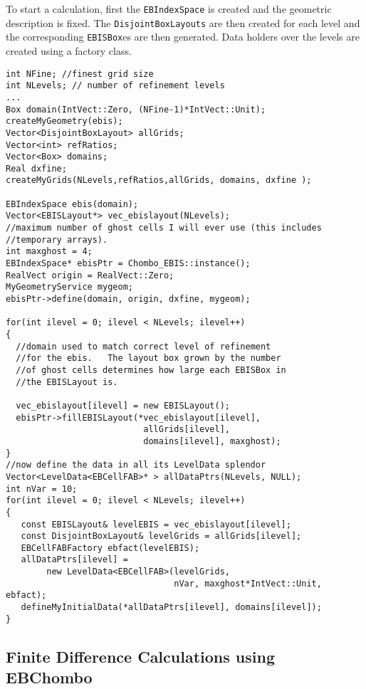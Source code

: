 To start a calculation,
first the {\tt EBIndexSpace} is created and the geometric
description is fixed.    The {\tt DisjointBoxLayouts} are then created
for each level and the corresponding {\tt EBISBox}es are then
generated.  Data holders over the levels are created using
a factory class.
\begin{small}
\begin{verbatim}
int NFine; //finest grid size
int NLevels; // number of refinement levels
...
Box domain(IntVect::Zero, (NFine-1)*IntVect::Unit);
createMyGeometry(ebis);
Vector<DisjointBoxLayout> allGrids;
Vector<int> refRatios;        
Vector<Box> domains;
Real dxfine;        
createMyGrids(NLevels,refRatios,allGrids, domains, dxfine );

EBIndexSpace ebis(domain);
Vector<EBISLayout*> vec_ebislayout(NLevels);
//maximum number of ghost cells I will ever use (this includes
//temporary arrays).
int maxghost = 4;     
EBIndexSpace* ebisPtr = Chombo_EBIS::instance();
RealVect origin = RealVect::Zero;
MyGeometryService mygeom;
ebisPtr->define(domain, origin, dxfine, mygeom);   

for(int ilevel = 0; ilevel < NLevels; ilevel++)
{       
  //domain used to match correct level of refinement
  //for the ebis.   The layout box grown by the number
  //of ghost cells determines how large each EBISBox in
  //the EBISLayout is.      
        
  vec_ebislayout[ilevel] = new EBISLayout();
  ebisPtr->fillEBISLayout(*vec_ebislayout[ilevel],
                           allGrids[ilevel], 
                           domains[ilevel], maxghost);
}
//now define the data in all its LevelData splendor
Vector<LevelData<EBCellFAB>* > allDataPtrs(NLevels, NULL);
int nVar = 10;
for(int ilevel = 0; ilevel < NLevels; ilevel++)
{       
   const EBISLayout& levelEBIS = vec_ebislayout[ilevel];
   const DisjointBoxLayout& levelGrids = allGrids[ilevel];
   EBCellFABFactory ebfact(levelEBIS);
   allDataPtrs[ilevel] = 
        new LevelData<EBCellFAB>(levelGrids, 
                                 nVar, maxghost*IntVect::Unit, ebfact);
   defineMyInitialData(*allDataPtrs[ilevel], domains[ilevel]);     
}
\end{verbatim}
\end{small}

\subsection{Finite Difference Calculations using EBChombo}

